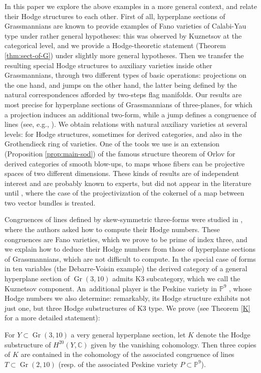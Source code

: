 \documentclass[11pt]{article}
\newcommand{\resp}{resp.\xspace}
\theoremstyle{plain}
\theoremstyle{definition}
\DeclareMathOperator{\Gr}{Gr}
\newcommand{\CC}{\mathbb{C}}
\newcommand{\PP}{\mathbb{P}}
\begin{document}
In this paper we explore the above examples in a more general context, and
relate their Hodge structures to each other.
First of all, hyperplane sections of Grassmannians are known to provide examples of Fano varieties
of Calabi-Yau type under
rather general hypotheses: this was observed by Kuznetsov \cite{kuz-fractional} at the categorical level, and we
provide a Hodge-theoretic statement (Theorem \ref{thm:sect-of-G})
under slightly more general hypotheses.
Then we transfer the resulting special Hodge structures to auxiliary varieties inside
other Grassmannians, through two different types of basic operations: projections on the one
hand, and jumps on the other hand, the latter being defined by the natural correspondences
afforded by two-steps flag manifolds. Our results are most precise for hyperplane sections
of Grassmannians of three-planes, for which a projection induces an additional two-form, while
a jump defines a congruence of lines (see, e.g., \cite{dpfmr}). We obtain relations with natural auxiliary varieties
at several levels: for Hodge structures, sometimes for derived categories, and also in the
Grothendieck ring of varieties. One of the tools we use is an extension (Proposition \ref{prop:main-sod}) of the famous
structure theorem of Orlov for derived categories of smooth blow-ups, to maps whose
fibers can be projective spaces of two different dimensions. These kinds of results are of
independent interest and are probably known
to experts, but did not appear in the literature until \cite{Jiang-Leung}, where the case of
the projectivization of the cokernel of a map between two vector bundles is treated.

Congruences of lines defined by skew-symmetric three-forms were studied in \cite{dpfmr},
where the authors asked how to compute their Hodge numbers. These congruences are Fano
varieties, which we prove to be prime of index three, and we explain how to deduce their
Hodge numbers from those of hyperplane sections of \hbox{Grassmannians}, which are not difficult
to compute. In the special case
of forms in ten variables (the Debarre-Voisin example) the derived category of a general hyperplane section of $\Gr(3,10)$
\hbox{admits} K3 subcategory, which we call the Kuznetsov component. An~additional player
is the Peskine variety in $\PP^9$ \cite{dpfmr}, whose Hodge numbers we also determine: remarkably, its
Hodge structure exhibits not just one, but three Hodge substructures of K3 type.
We prove (see Theorem \ref{K} for a more detailed statement):

\begin{theorem*}
For $Y\subset \Gr(3,10)$ a very general hyperplane section, let $K$ denote the Hodge substructure of $H^{20}(Y,\CC)$ given by the vanishing cohomology. Then three copies of $K$ are contained
in the cohomology of the associated congruence of lines $T\subset \Gr(2,10)$ (\resp of the associated Peskine variety $P\subset\PP^9$).
\end{theorem*}
\end{document}
